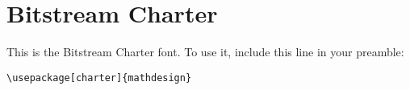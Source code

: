 \documentclass{article}
\begin{document}
\section*{Bitstream Charter}
This is the Bitstream Charter font.
To use it, include this line in your preamble:
\begin{verbatim}
\usepackage[charter]{mathdesign}
\end{verbatim}


\end{document}
